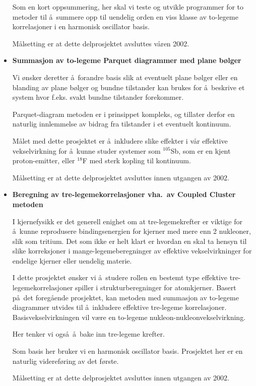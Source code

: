 \begin{itemize}
Som en kort oppsummering, her skal vi teste og utvikle programmer
for to metoder til \aa\ summere opp til uendelig orden en viss
klasse av to-legeme korrelasjoner i en harmonisk oscillator basis.

M\aa lsetting er at dette delprosjektet avsluttes v\aa ren 2002.

\item  {\bf Summasjon av to-legeme Parquet diagrammer med plane b\o lger}

Vi \o nsker deretter \aa\ forandre basis slik at eventuelt plane b\o lger
eller en blanding av plane b\o lger og bundne tilstander kan brukes for \aa\
beskrive et system hvor f.eks. svakt bundne tilstander forekommer.

Parquet-diagram metoden er i prinsippet kompleks, og tillater derfor
en naturlig innlemmelse av bidrag fra tilstander i et eventuelt kontinuum.

M\aa let med dette prosjektet er \aa\ inkludere slike effekter i v\aa r
effektive vekselvirkning for \aa\ kunne studer systemer som
$^{105}$Sb, som er en kjent proton-emitter, eller 
$^{18}$F med sterk kopling til kontinuum.

M\aa lsetting er at dette delprosjektet avsluttes innen utgangen av  2002.

\item {\bf Beregning av tre-legemekorrelasjoner vha.\ av 
            Coupled Cluster metoden}

I kjernefysikk er det generell enighet om at
tre-legemekrefter er viktige for \aa\ kunne reprodusere 
bindingsenergien for kjerner med mere enn 2 nukleoner, slik
som tritium.
Det som ikke er helt klart er hvordan en skal
ta hensyn til slike korreksjoner
i mange-legemeberegninger av effektive vekselvirkninger
for endelige kjerner eller uendelig materie. 

I dette prosjektet \o nsker vi \aa\ studere rollen en bestemt
type effektive tre-legemekorrelasjoner spiller 
i strukturberegninger for atomkjerner. Basert p\aa\ det foreg\aa ende
prosjektet, kan metoden med summasjon av to-legeme diagrammer
utvides til \aa\ inkludere effektive tre-legeme korrelasjoner.  
Basisvekselvirkningen vil v\ae re
en to-legeme nukleon-nukleonvekselvirkning.

Her tenker vi ogs\aa\ \aa\ bake inn tre-legeme krefter.

Som basis her bruker vi  en
harmonisk oscillator basis.
Prosjektet her er en naturlig videref\o ring av det f\o rste.


M\aa lsetting er at dette delprosjektet avsluttes innen utgangen av 2002.



\end{itemize}
